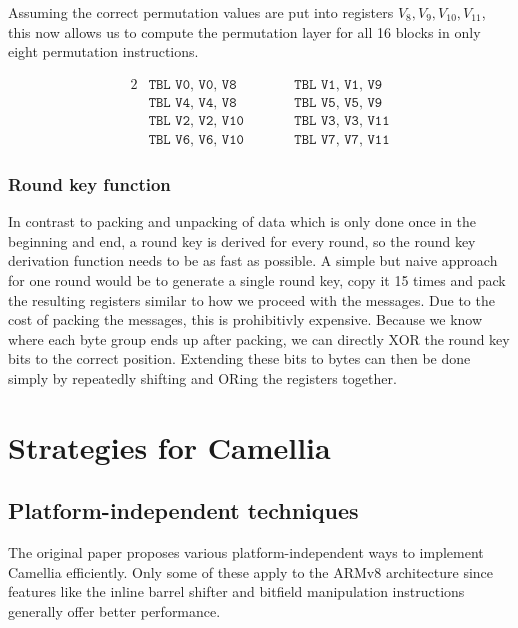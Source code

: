 Assuming the correct permutation values are put into registers
$V_8,V_9,V_{10},V_{11}$, this now allows us to compute the permutation layer
for all 16 blocks in only eight permutation instructions.

\begin{alignat*}{2}
    &\texttt{TBL V0, V0, V8}\qquad &&\texttt{TBL V1, V1, V9} \\
    &\texttt{TBL V4, V4, V8}\qquad &&\texttt{TBL V5, V5, V9} \\
    &\texttt{TBL V2, V2, V10}\qquad &&\texttt{TBL V3, V3, V11} \\
    &\texttt{TBL V6, V6, V10}\qquad &&\texttt{TBL V7, V7, V11}
\end{alignat*}

\subsubsection{Round key function}

In contrast to packing and unpacking of data which is only done once in the
beginning and end, a round key is derived for every round, so the round key
derivation function needs to be as fast as possible. A simple but naive
approach for one round would be to generate a single round key, copy it 15
times and pack the resulting registers similar to how we proceed with the
messages. Due to the cost of packing the messages, this is prohibitivly
expensive. Because we know where each byte group ends up after packing, we can
directly XOR the round key bits to the correct position. Extending these bits
to bytes can then be done simply by repeatedly shifting and ORing the registers
together.

\section{Strategies for Camellia}

\subsection{Platform-independent techniques}

The original paper proposes various platform-independent ways to implement
Camellia efficiently. Only some of these apply to the ARMv8 architecture since
features like the inline barrel shifter and bitfield manipulation instructions
generally offer better performance.

